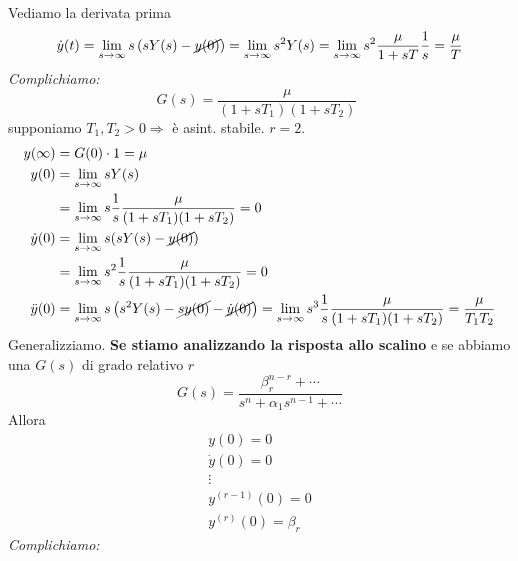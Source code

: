 \documentclass[10pt,a4paper]{book}
\begin{document}
Vediamo la derivata prima
\begin{equation*}
\dot{y}( t) =\lim _{s\rightarrow \infty } s\left( sY( s) -\cancel{y( 0)}\right) =\lim _{s\rightarrow \infty } s^{2} Y( s) =\lim _{s\rightarrow \infty } s^{2}\frac{\mu }{1+sT}\frac{1}{s} =\frac{\mu }{T}
\end{equation*}
\textit{Complichiamo:}
\begin{equation*}
G(s)=\frac{\mu }{( 1+sT_{1})( 1+sT_{2})} \ \ 
\end{equation*}
supponiamo $T_{1} ,T_{2}  >0\Rightarrow $ è asint. stabile. $r=2$.
\begin{equation*}
\begin{aligned}
y(\infty ) & =G(0)\cdot 1=\mu \\
y(0) & =\lim _{s\rightarrow \infty } sY(s)\\
 & =\lim _{s\rightarrow \infty } s\frac{1}{s}\frac{\mu }{( 1+sT_{1})( 1+sT_{2})} =0\\
\dot{y} (0) & =\lim _{s\rightarrow \infty } s(sY(s)-\cancel{y(0)} )\\
 & =\lim _{s\rightarrow \infty } s^{2}\frac{1}{s}\frac{\mu }{( 1+sT_{1})( 1+sT_{2})} =0\\
\ddot{y} (0) & =\lim _{s\rightarrow \infty } s\left( s^{2} Y(s)-\cancel{sy(0)} -\cancel{\dot{y} (0)}\right) =\lim _{s\rightarrow \infty } s^{3}\frac{1}{s}\frac{\mu }{( 1+sT_{1})( 1+sT_{2})} =\frac{\mu }{T_{1} T_{2}}
\end{aligned}
\end{equation*}
Generalizziamo. \textbf{Se stiamo analizzando la risposta allo scalino} e se abbiamo una $G( s)$ di grado relativo $r$
\begin{equation*}
G( s) =\frac{\beta ^{n-r}_{r} +\cdots }{s^{n} +\alpha _{1} s^{n-1} +\cdots }
\end{equation*}
Allora
\begin{equation*}
\boxed{\begin{array}{ c }
y( 0) =0\\
\dot{y}( 0) =0\\
\vdots \\
y^{( r-1)}( 0) =0\\
y^{( r)}( 0) =\beta _{r}
\end{array}}
\end{equation*}
\textit{Complichiamo:}
\end{document}
